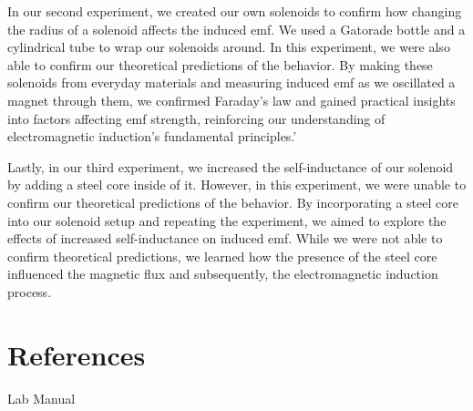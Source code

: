 \documentclass[11pt]{article}
\let\oldsection\section
\renewcommand\section{\clearpage\oldsection}
\begin{document}
    In our second experiment, we created our own solenoids to confirm how changing the radius of a solenoid affects the induced emf. We used a Gatorade bottle and a cylindrical tube to wrap our solenoids around. In this experiment, we were also able to confirm our theoretical predictions of the behavior. By making these solenoids from everyday materials and measuring induced emf as we oscillated a magnet through them, we confirmed Faraday's law and gained practical insights into factors affecting emf strength, reinforcing our understanding of electromagnetic induction's fundamental principles.'

    Lastly, in our third experiment, we increased the self-inductance of our solenoid by adding a steel core inside of it. However, in this experiment, we were unable to confirm our theoretical predictions of the behavior. By incorporating a steel core into our solenoid setup and repeating the experiment, we aimed to explore the effects of increased self-inductance on induced emf. While we were not able to confirm theoretical predictions, we learned how the presence of the steel core influenced the magnetic flux and subsequently, the electromagnetic induction process.


    \appendix
    \section{References}\label{sec:references}

    Lab Manual
\end{document}

